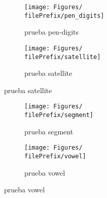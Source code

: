 \begin{figure}[ht]
  \centering
  \begin{subfigure}[b]{0.5\linewidth}
    \centering\texttt{[image: Figures/\\filePrefix/pen\_digits]}
    \caption{prueba pen-digits}
    \label{fig:\undPrefix_pen_digits}
  \end{subfigure}%
  \begin{subfigure}[b]{0.5\linewidth}
    \centering\texttt{[image: Figures/\\filePrefix/satellite]}
    \caption{prueba satellite}
    \label{fig:\undPrefix_satellite}
  \end{subfigure}
\end{figure}

\begin{figure}[ht]
  \centering
  \begin{subfigure}[b]{0.5\linewidth}
    \centering\texttt{[image: Figures/\\filePrefix/segment]}
    \caption{prueba segment}
    \label{fig:\undPrefix_segment}
  \end{subfigure}%
  \begin{subfigure}[b]{0.5\linewidth}
    \centering\texttt{[image: Figures/\\filePrefix/vowel]}
    \caption{prueba vowel}
    \label{fig:\undPrefix_vowel}
  \end{subfigure}
\end{figure}


\let\major\undefined
\let\minor\undefined

\let\undPrefix\undefined
\let\dotPrefix\undefined
\let\scoPrefix\undefined

\let\filePrefix\undefined
